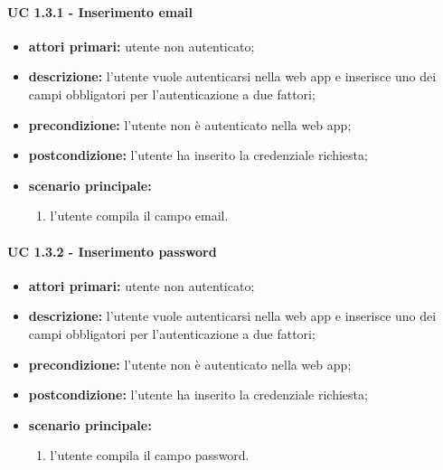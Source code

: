			\paragraph{UC 1.3.1 - Inserimento email}
			\begin{itemize}
				\item \textbf{attori primari:} utente non autenticato;
				\item \textbf{descrizione:} l'utente vuole autenticarsi nella web app e inserisce uno dei campi obbligatori per l'autenticazione a due fattori;
				\item \textbf{precondizione:} l'utente non è autenticato nella web app;
				\item \textbf{postcondizione:} l'utente ha inserito la credenziale richiesta;
				\item \textbf{scenario principale:}
				\begin{enumerate}
					\item l'utente compila il campo email.
				\end{enumerate}
			\end{itemize}

			\paragraph{UC 1.3.2 - Inserimento password}
			\begin{itemize}
				\item \textbf{attori primari:} utente non autenticato;
				\item \textbf{descrizione:} l'utente vuole autenticarsi nella web app e inserisce uno dei campi obbligatori per l'autenticazione a due fattori;
				\item \textbf{precondizione:} l'utente non è autenticato nella web app;
				\item \textbf{postcondizione:} l'utente ha inserito la credenziale richiesta;
				\item \textbf{scenario principale:}
				\begin{enumerate}
					\item l'utente compila il campo password.
				\end{enumerate}
			\end{itemize}

